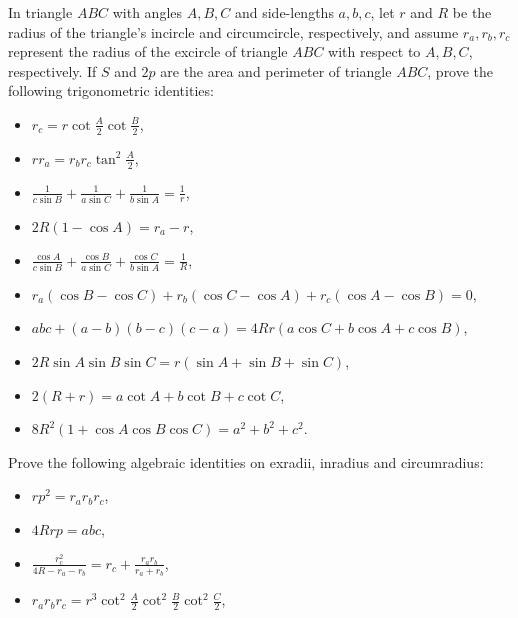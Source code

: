 \begin{tcolorbox}[title={More Identities on Triangle Radii}]
    \begin{question}[name=Trigonometric Identities on Radii]
        In triangle $ABC$ with angles $A,B,C$ and side-lengths $a,b,c$, let $r$ and $R$ be the radius of the triangle's incircle and circumcircle, respectively, and assume $r_a,r_b,r_c$ represent the radius of the excircle of triangle $ABC$ with respect to $A,B,C$, respectively. If $S$ and $2p$ are the area and perimeter of triangle $ABC$, prove the following trigonometric identities:
        \begin{itemize}
            \item $r_c=r\cot \frac{A}{2} \cot \frac{B}{2}$,
            \item $rr_a=r_br_c\tan^2 \frac{A}{2}$,
            \item $\displaystyle \frac{1}{c \sin B}+ \frac{1}{a \sin C}+ \frac{1}{b \sin A}=\frac{1}{r}$,
            \item $2R(1-\cos A)=r_a-r$,
            \item $\displaystyle \frac{\cos A}{c\sin B}+ \frac{\cos B}{a\sin C}+ \frac{\cos C}{b\sin A} = \frac{1}{R}$,
            \item $r_a(\cos B - \cos C) + r_b(\cos C - \cos A) + r_c(\cos A - \cos B)=0$,       
            \item $abc+(a-b)(b-c)(c-a)=4Rr(a\cos C + b\cos A + c\cos B)$,
            \item $2R\sin A \sin B \sin C = r(\sin A + \sin B + \sin C)$,
            \item $2(R+r)=a\cot A + b\cot B + c \cot C$,
            \item $8R^2(1+\cos A \cos B \cos C) = a^2+b^2+c^2$.
        \end{itemize}
    \end{question}
    \begin{question}[name=Algebraic Identities on Radii]
        Prove the following algebraic identities on exradii, inradius and circumradius:
        \begin{itemize}
            \item $rp^2=r_ar_br_c$,
            \item $4Rrp=abc$,
            \item $\displaystyle \frac{r_c^2}{4R-r_a-r_b} = r_c +  \frac{r_ar_b}{r_a+r_b}$,        
            \item $r_ar_br_c = r^3\cot^2\frac{A}{2}\cot^2\frac{B}{2}\cot^2\frac{C}{2}$,        

\end{itemize}
\end{question}
\end{tcolorbox}
